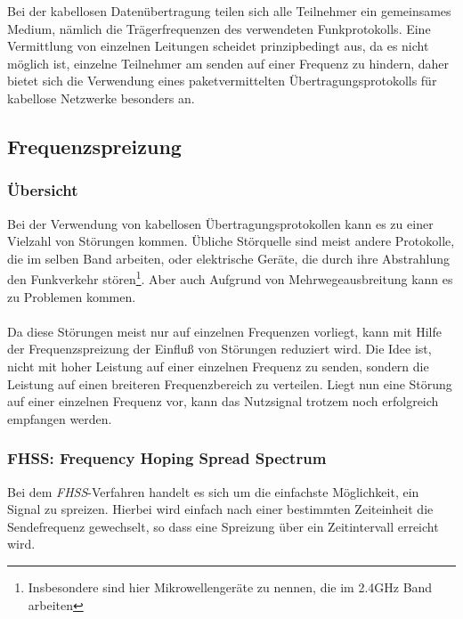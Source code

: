         Bei der kabellosen Datenübertragung teilen sich alle Teilnehmer ein gemeinsames Medium, nämlich die 
        Trägerfrequenzen des verwendeten Funkprotokolls. Eine Vermittlung von einzelnen Leitungen scheidet 
        prinzipbedingt aus, da es nicht möglich ist, einzelne Teilnehmer am senden auf einer Frequenz zu 
        hindern, daher bietet sich die Verwendung eines paketvermittelten Übertragungsprotokolls für kabellose
        Netzwerke besonders an.
        
    \subsection{Frequenzspreizung}
        \subsubsection{Übersicht}
            Bei der Verwendung von kabellosen Übertragungsprotokollen kann es zu einer Vielzahl von 
            Störungen kommen. Übliche Störquelle sind meist andere Protokolle, die im selben Band arbeiten,
            oder elektrische Geräte, die durch ihre Abstrahlung den Funkverkehr stören\footnote{Insbesondere
            sind hier Mikrowellengeräte zu nennen, die im 2.4GHz Band arbeiten}. Aber auch Aufgrund von 
            Mehrwegeausbreitung kann es zu Problemen kommen.\\
            \\
            Da diese Störungen meist nur auf einzelnen Frequenzen vorliegt, kann mit Hilfe der 
            Frequenzspreizung der Einfluß von Störungen reduziert wird. Die Idee ist, nicht mit
            hoher Leistung auf einer einzelnen Frequenz zu senden, sondern die Leistung auf einen
            breiteren Frequenzbereich zu verteilen. Liegt nun eine Störung auf einer einzelnen
            Frequenz vor, kann das Nutzsignal trotzem noch erfolgreich empfangen werden.

        \subsubsection{FHSS: Frequency Hoping Spread Spectrum}\label{FHSS}
            Bei dem \textsl{FHSS}-Verfahren handelt es sich um die einfachste Möglichkeit, ein
            Signal zu spreizen. Hierbei wird einfach nach einer bestimmten Zeiteinheit die
            Sendefrequenz gewechselt, so dass eine Spreizung über ein Zeitintervall erreicht wird.

